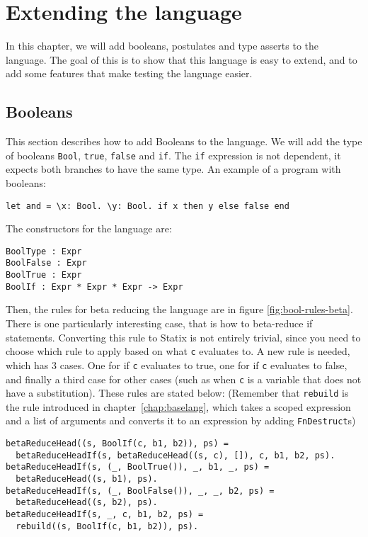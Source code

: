 \chapter{\label{chap:bools}Extending the language}

In this chapter, we will add booleans, postulates and type asserts to the language. The goal of this is to show that this language is easy to extend, and to add some features that make testing the language easier.

\section{Booleans}

This section describes how to add Booleans to the language. We will add the type of booleans \verb|Bool|, \verb|true|, \verb|false| and \verb|if|. The \verb|if| expression is not dependent, it expects both branches to have the same type. An example of a program with booleans: 

\begin{lstlisting}
let and = \x: Bool. \y: Bool. if x then y else false end
\end{lstlisting}
The constructors for the language are:

\begin{lstlisting}
BoolType : Expr
BoolFalse : Expr
BoolTrue : Expr
BoolIf : Expr * Expr * Expr -> Expr
\end{lstlisting}
Then, the rules for beta reducing the language are in figure \ref{fig:bool-rules-beta}. There is one particularly interesting case, that is how to beta-reduce if statements. Converting this rule to Statix is not entirely trivial, since you need to choose which rule to apply based on what \verb|c| evaluates to. A new rule is needed, which has 3 cases. One for if \verb|c| evaluates to true, one for if \verb|c| evaluates to false, and finally a third case for other cases (such as when \verb|c| is a variable that does not have a substitution). These rules are stated below: (Remember that \verb|rebuild| is the rule introduced in chapter~\ref{chap:baselang}, which takes a scoped expression and a list of arguments and converts it to an expression by adding \verb|FnDestruct|s)

\begin{lstlisting}
betaReduceHead((s, BoolIf(c, b1, b2)), ps) = 
  betaReduceHeadIf(s, betaReduceHead((s, c), []), c, b1, b2, ps).
betaReduceHeadIf(s, (_, BoolTrue()), _, b1, _, ps) = 
  betaReduceHead((s, b1), ps).
betaReduceHeadIf(s, (_, BoolFalse()), _, _, b2, ps) = 
  betaReduceHead((s, b2), ps).
betaReduceHeadIf(s, _, c, b1, b2, ps) = 
  rebuild((s, BoolIf(c, b1, b2)), ps).
\end{lstlisting}

